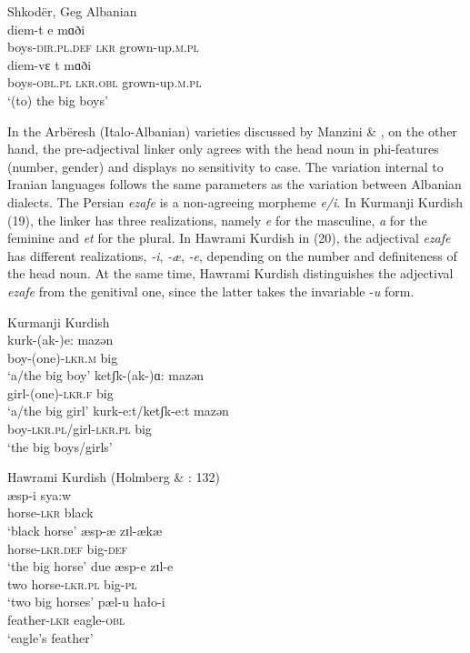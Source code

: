 \documentclass[output=paper]{langsci/langscibook}
\begin{document}
\ea%
    Shkodër, Geg Albanian\label{ex:manzini:18}\\
    \ea
    \gll diem-t     e   mɑði     \\
         boys-\textsc{dir.pl.def}  \textsc{lkr}  grown-up.\textsc{m.pl}  \\
    \ex
    \gll diem-vɛ    t     mɑði \\
         boys-\textsc{obl.pl}     \textsc{lkr.obl}  grown-up.\textsc{m.pl}\\
    \glt ‘(to) the big boys’  
    \z
\z

In the Arbëresh (Italo-Albanian) varieties discussed by Manzini \& \citet{Savoia2011a}, on the other hand, the pre-adjectival linker only agrees with the head noun in phi-features (number, gender) and displays no sensitivity to case. The variation internal to Iranian languages follows the same parameters as the variation between Albanian dialects. The Persian \textit{ezafe} is a non-agreeing morpheme \textit{e/i}. In Kurmanji Kurdish (19), the linker has three realizations, namely \textit{e} for the masculine, \textit{a} for the feminine and \textit{et} for the plural. In Hawrami Kurdish in (20), the adjectival \textit{ezafe} has different realizations, \textit{{}-i}, \textit{{}-æ}, \textit{{}-e}, depending on the number and definiteness of the head noun. At the same time, Hawrami Kurdish distinguishes the adjectival \textit{ezafe} from the genitival one, since the latter takes the invariable -\textit{u} form.

\ea%
    Kurmanji Kurdish \citep{FrancoEtAl2015}\label{ex:manzini:19}\\
    \ea
    \gll kurk-(ak-)e:     mazən       \\
         boy-(one)-\textsc{lkr.m}    big     \\
    \glt ‘a/the big boy’
    \ex
    \gll ketʃk-(ak-)ɑ:    mazən      \\
         girl-(one)-\textsc{lkr.f}   big     \\
    \glt ‘a/the big girl’
    \ex
    \gll kurk-e:t/ketʃk-e:t     mazən     \\
         boy-\textsc{lkr.pl}/girl-\textsc{lkr.pl}  big   \\
    \glt ‘the big boys/girls’
    \z
\z


\ea%
    Hawrami Kurdish (Holmberg \& \citealt{Odden2008}: 132)\label{ex:manzini:20}\\
    \ea
    \gll æsp-i     sya:w      \\
         horse-\textsc{lkr}  black\\
    \glt ‘black horse’
    \ex
    \gll æsp{}-æ     zɪl-ækæ\\
         horse-\textsc{lkr.def}  big-\textsc{def}\\
    \glt ‘the big horse’ 
    \ex
    \gll due   æsp-e    zɪl-e \\
         two   horse-\textsc{lkr.pl}  big-\textsc{pl} \\
    \glt ‘two big horses’
    \ex
    \gll pæl-u     hało-i\\
         feather-\textsc{lkr}   eagle-\textsc{obl}\\
    \glt ‘eagle’s feather’ 
    \z
\z        
\end{document}
